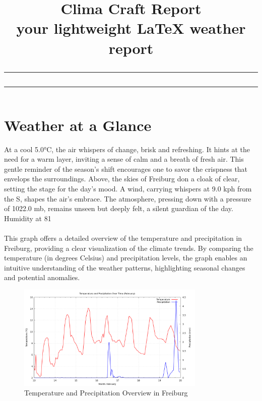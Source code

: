 \documentclass[12pt]{article}
\title{\vspace{-2cm} %
           \Huge\textbf{Clima Craft Report} \\ [0.5cm]  %
           \Large{your lightweight LaTeX weather report} %
           \vspace{0.5cm} \\ \hrule \vspace{-0.2cm} \hrule
    }
\author{}
\date{}
\begin{document}
    \maketitle
    \section*{Weather at a Glance }
At a cool 5.0°C, the air whispers of change, brisk and refreshing. It hints at the need for a warm layer, inviting a sense of calm and a breath of fresh air. This gentle reminder of the season's shift encourages one to savor the crispness that envelops the surroundings. Above, the skies of Freiburg don a cloak of clear, setting the stage for the day's mood. A wind, carrying whispers at 9.0 kph from the S, shapes the air's embrace. The atmosphere, pressing down with a pressure of 1022.0 mb, remains unseen but deeply felt, a silent guardian of the day. Humidity at 81%
\paragraph{}This graph offers a detailed overview of the temperature and precipitation in Freiburg, providing a clear visualization of the climate trends. By comparing the temperature (in degrees Celsius) and precipitation levels, the graph enables an intuitive understanding of the weather patterns, highlighting seasonal changes and potential anomalies.
\begin{figure}[h]
\centering
\includegraphics[width=0.8\textwidth]{data/graph/temperature_precipitation_graph.png}
\caption{Temperature and Precipitation Overview in Freiburg}
\end{figure}
\end{document}
